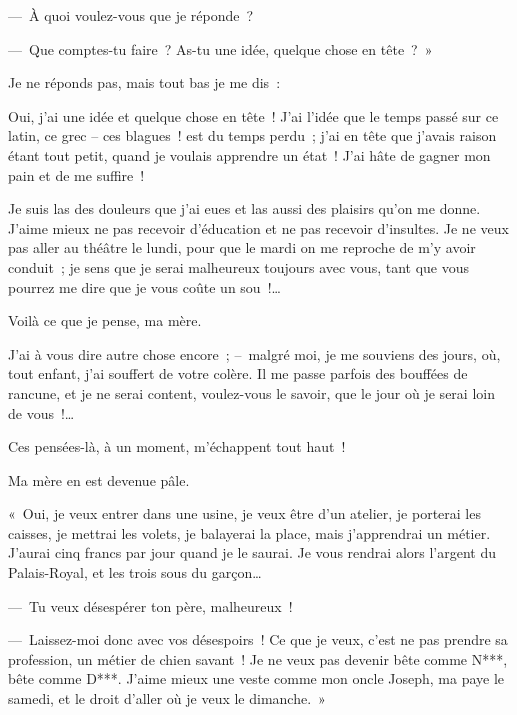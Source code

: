 \documentclass[french,twoside]{book} %
\newcommand{\astertri}{\medskip\par\centerline{\color{rubric}\large\selectfont{\syms ✻\,✻\,✻}}\medskip\par}%
\begin{document}
— À quoi voulez-vous que je réponde ?\par
— Que comptes-tu faire ? As-tu une idée, quelque chose en tête ? »\par
Je ne réponds pas, mais tout bas je me dis :\par
Oui, j’ai une idée et quelque chose en tête ! J’ai l’idée que le temps passé sur ce latin, ce grec – ces blagues ! est du temps perdu ; j’ai en tête que j’avais raison étant tout petit, quand je voulais apprendre un état ! J’ai hâte de gagner mon pain et de me suffire !\par
Je suis las des douleurs que j’ai eues et las aussi des plaisirs qu’on me donne. J’aime mieux ne pas recevoir d’éducation et ne pas recevoir d’insultes. Je ne veux pas aller au théâtre le lundi, pour que le mardi on me reproche de m’y avoir conduit ; je sens que je serai malheureux toujours avec vous, tant que vous pourrez me dire que je vous coûte un sou !…\par
Voilà ce que je pense, ma mère.\par
J’ai à vous dire autre chose encore ; – malgré moi, je me souviens des jours, où, tout enfant, j’ai souffert de votre colère. Il me passe parfois des bouffées de rancune, et je ne serai content, voulez-vous le savoir, que le jour où je serai loin de vous !…\par
Ces pensées-là, à un moment, m’échappent tout haut !\par
Ma mère en est devenue pâle.\par
« Oui, je veux entrer dans une usine, je veux être d’un atelier, je porterai les caisses, je mettrai les volets, je balayerai la place, mais j’apprendrai un métier. J’aurai cinq francs par jour quand je le saurai. Je vous rendrai alors l’argent du Palais-Royal, et les trois sous du garçon…\par
— Tu veux désespérer ton père, malheureux !\par
— Laissez-moi donc avec vos désespoirs ! Ce que je veux, c’est ne pas prendre sa profession, un métier de chien savant ! Je ne veux pas devenir bête comme N***, bête comme D***. J’aime mieux une veste comme mon oncle Joseph, ma paye le samedi, et le droit d’aller où je veux le dimanche. »\par

\astertri
\end{document}
